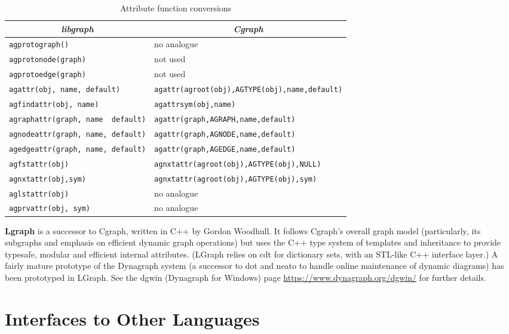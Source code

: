 \documentclass[11pt,letterpaper]{article}
\begin{document}
\begin{savenotes}
\begin{table*}[ht]
\centering
\begin{tabular}{|l|l|} \hline
\multicolumn{1}{|c|}{\em libgraph} & \multicolumn{1}{c|}{\em Cgraph} \\ \hline
\verb"agprotograph()"      &  no analogue \\ \hline
\verb"agprotonode(graph)"  &  not used \\ \hline
\verb"agprotoedge(graph)"  &  not used \\ \hline
\verb"agattr(obj, name, default)" & \verb"agattr(agroot(obj),AGTYPE(obj),name,default)" \\ \hline
\verb"agfindattr(obj, name)"& \verb"agattrsym(obj,name)" \\ \hline
\verb"agraphattr(graph, name  default)" & \verb"agattr(graph,AGRAPH,name,default)"\\ \hline
\verb"agnodeattr(graph, name, default)" & \verb"agattr(graph,AGNODE,name,default)"\\ \hline
\verb"agedgeattr(graph, name, default)" & \verb"agattr(graph,AGEDGE,name,default)"\\ \hline
\verb"agfstattr(obj)"   & \verb"agnxtattr(agroot(obj),AGTYPE(obj),NULL)"\\ \hline
\verb"agnxtattr(obj,sym)"   & \verb"agnxtattr(agroot(obj),AGTYPE(obj),sym)"\\ \hline
\verb"aglstattr(obj)" & no analogue\\ \hline
\verb"agprvattr(obj, sym)" & no analogue\\ \hline
\end{tabular}
\caption{Attribute function conversions}
\label{table:libgraph:a}
\end{table*}


{\bf Lgraph} is a successor to Cgraph, written in C++ by Gordon Woodhull.
It follows Cgraph's overall graph model (particularly, its subgraphs and
emphasis on efficient dynamic graph operations) but uses the C++ type
system of templates and inheritance to provide typesafe, modular and
efficient internal attributes.  (LGraph relies on cdt for dictionary
sets, with an STL-like C++ interface layer.)  A fairly mature prototype
of the Dynagraph system (a successor to dot and neato to handle
online maintenance of dynamic diagrams) has been prototyped in LGraph.
See the dgwin (Dynagraph for Windows) page 
\url{https://www.dynagraph.org/dgwin/} for further details.

\section{Interfaces to Other Languages}
\label{sec:interfacetootherlanguages}


\end{savenotes}
\end{document}
